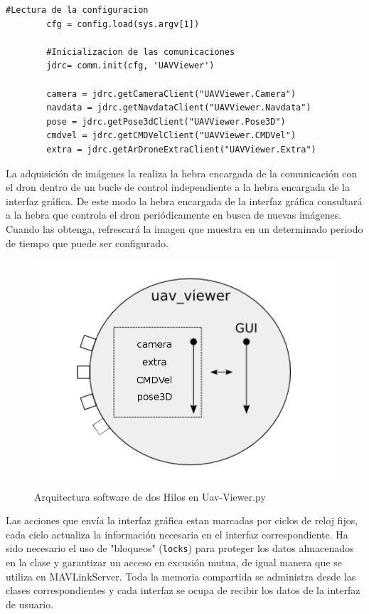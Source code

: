 \begin{lstlisting}[frame=single]
		#Lectura de la configuracion
        cfg = config.load(sys.argv[1])

        #Inicializacion de las comunicaciones
        jdrc= comm.init(cfg, 'UAVViewer')

        camera = jdrc.getCameraClient("UAVViewer.Camera")
        navdata = jdrc.getNavdataClient("UAVViewer.Navdata")
        pose = jdrc.getPose3dClient("UAVViewer.Pose3D")
        cmdvel = jdrc.getCMDVelClient("UAVViewer.CMDVel")
        extra = jdrc.getArDroneExtraClient("UAVViewer.Extra")
\end{lstlisting}

La adquisición de imágenes la realiza la hebra encargada de la comunicación con el dron dentro de un bucle de control independiente a la hebra encargada de la interfaz gráfica.  De este modo la hebra encargada de la interfaz gráfica consultará a la hebra que controla el dron periódicamente en busca de nuevas imágenes. Cuando las obtenga, refrescará la imagen que muestra en un determinado periodo de tiempo que puede ser configurado.

\begin{figure}[H]
  \centering
  \includegraphics[scale=0.3]{imagenes/uavViewer.png}
  \caption{Arquitectura software de dos Hilos en Uav-Viewer.py}
  \label{fig:uavViewer}
\end{figure}

Las acciones que envía la interfaz gráfica estan marcadas por ciclos de reloj fijos, cada ciclo actualiza la información necesaria en el interfaz correspondiente. Ha sido necesario el uso de "bloqueos" (\texttt{locks}) para proteger los datos almacenados en la clase y garantizar un acceso en excusión mutua, de igual manera que se utiliza en MAVLinkServer. Toda la memoria compartida se administra desde las clases correspondientes y cada interfaz se ocupa de recibir los datos de la interfaz de usuario.

